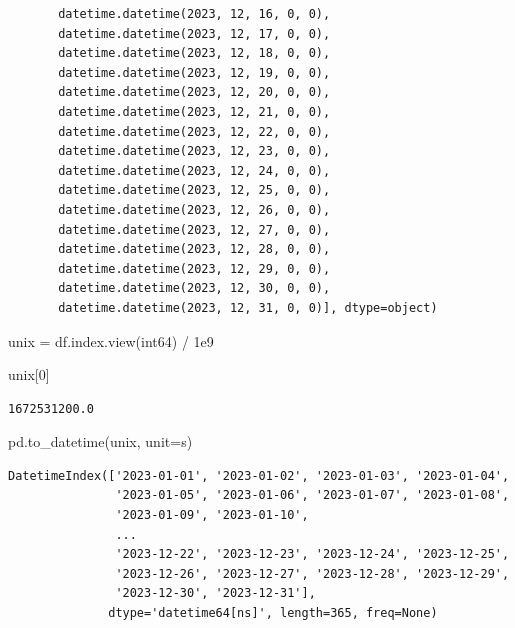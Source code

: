 \documentclass[
  letterpaper,
  DIV=11,
  numbers=noendperiod,
  oneside]{scrreprt}
\newenvironment{Shaded}{\begin{snugshade}}{\end{snugshade}}
\newcommand{\DecValTok}[1]{\textcolor[rgb]{0.68,0.00,0.00}{#1}}
\newcommand{\FloatTok}[1]{\textcolor[rgb]{0.68,0.00,0.00}{#1}}
\newcommand{\NormalTok}[1]{\textcolor[rgb]{0.00,0.23,0.31}{#1}}
\newcommand{\OperatorTok}[1]{\textcolor[rgb]{0.37,0.37,0.37}{#1}}
\newcommand{\StringTok}[1]{\textcolor[rgb]{0.13,0.47,0.30}{#1}}
\begin{document}
\begin{verbatim}
       datetime.datetime(2023, 12, 16, 0, 0),
       datetime.datetime(2023, 12, 17, 0, 0),
       datetime.datetime(2023, 12, 18, 0, 0),
       datetime.datetime(2023, 12, 19, 0, 0),
       datetime.datetime(2023, 12, 20, 0, 0),
       datetime.datetime(2023, 12, 21, 0, 0),
       datetime.datetime(2023, 12, 22, 0, 0),
       datetime.datetime(2023, 12, 23, 0, 0),
       datetime.datetime(2023, 12, 24, 0, 0),
       datetime.datetime(2023, 12, 25, 0, 0),
       datetime.datetime(2023, 12, 26, 0, 0),
       datetime.datetime(2023, 12, 27, 0, 0),
       datetime.datetime(2023, 12, 28, 0, 0),
       datetime.datetime(2023, 12, 29, 0, 0),
       datetime.datetime(2023, 12, 30, 0, 0),
       datetime.datetime(2023, 12, 31, 0, 0)], dtype=object)
\end{verbatim}

\begin{Shaded}
\begin{Highlighting}[]
\NormalTok{unix }\OperatorTok{=}\NormalTok{ df.index.view(}\StringTok{\textquotesingle{}int64\textquotesingle{}}\NormalTok{) }\OperatorTok{/} \FloatTok{1e9}
\end{Highlighting}
\end{Shaded}

\begin{Shaded}
\begin{Highlighting}[]
\NormalTok{unix[}\DecValTok{0}\NormalTok{]}
\end{Highlighting}
\end{Shaded}

\begin{verbatim}
1672531200.0
\end{verbatim}

\begin{Shaded}
\begin{Highlighting}[]
\NormalTok{pd.to\_datetime(unix, unit}\OperatorTok{=}\StringTok{\textquotesingle{}s\textquotesingle{}}\NormalTok{)}
\end{Highlighting}
\end{Shaded}

\begin{verbatim}
DatetimeIndex(['2023-01-01', '2023-01-02', '2023-01-03', '2023-01-04',
               '2023-01-05', '2023-01-06', '2023-01-07', '2023-01-08',
               '2023-01-09', '2023-01-10',
               ...
               '2023-12-22', '2023-12-23', '2023-12-24', '2023-12-25',
               '2023-12-26', '2023-12-27', '2023-12-28', '2023-12-29',
               '2023-12-30', '2023-12-31'],
              dtype='datetime64[ns]', length=365, freq=None)
\end{verbatim}
\end{document}
